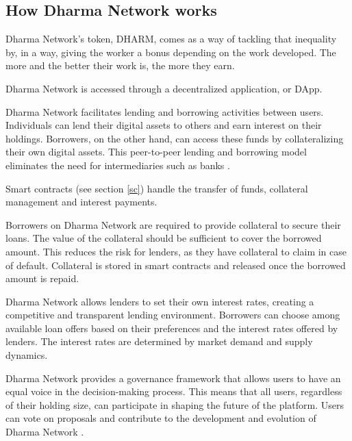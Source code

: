 \subsection{How Dharma Network works}

Dharma Network's token, DHARM, comes as a way of tackling that inequality by, in a way, giving the worker a bonus depending on the work developed. The more and the better their work is, the more they earn.\newline

Dharma Network is accessed through a decentralized application, or DApp.\newline

Dharma Network facilitates lending and borrowing activities between users. Individuals can lend their digital assets to others and earn interest on their holdings. Borrowers, on the other hand, can access these funds by collateralizing their own digital assets. This peer-to-peer lending and borrowing model eliminates the need for intermediaries such as banks \cite{dharma}.\newline

Smart contracts (see section \ref{sc}) handle the transfer of funds, collateral management and interest payments.\newline

Borrowers on Dharma Network are required to provide collateral to secure their loans. The value of the collateral should be sufficient to cover the borrowed amount. This reduces the risk for lenders, as they have collateral to claim in case of default. Collateral is stored in smart contracts and released once the borrowed amount is repaid.\newline

Dharma Network allows lenders to set their own interest rates, creating a competitive and transparent lending environment. Borrowers can choose among available loan offers based on their preferences and the interest rates offered by lenders. The interest rates are determined by market demand and supply dynamics.\newline

Dharma Network provides a governance framework that allows users to have an equal voice in the decision-making process. This means that all users, regardless of their holding size, can participate in shaping the future of the platform. Users can vote on proposals and contribute to the development and evolution of Dharma Network \cite{dharma}.\newline

